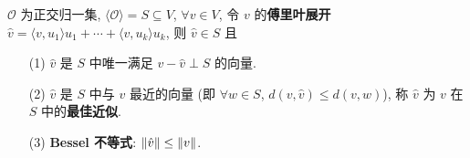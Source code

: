 \documentclass{note}
\begin{document}
\begin{thm}[(课本定理 9.11)]
    $\mathcal{O}$ 为正交归一集, $\langle\mathcal{O}\rangle=S\subseteq V$, $\forall v\in V$, 令 $v$ 的\textbf{傅里叶展开} $\hat{v}=\langle v,u_1\rangle u_1+\cdots+\langle v,u_k\rangle u_k$, 则 $\hat{v}\in S$ 且
    \begin{itemize}
        \item[(1)] $\hat{v}$ 是 $S$ 中唯一满足 $v-\hat{v}\perp S$ 的向量.
        \item[(2)] $\hat{v}$ 是 $S$ 中与 $v$ 最近的向量 (即 $\forall w\in S$, $d(v,\hat{v})\leq d(v,w)$), 称 $\hat{v}$ 为 $v$ 在 $S$ 中的\textbf{最佳近似}.
        \item[(3)] \textbf{Bessel 不等式}: $\left\lVert\hat{v}\right\rVert\leq\left\lVert v\right\rVert$.
    \end{itemize}
\end{thm}
\end{document}
